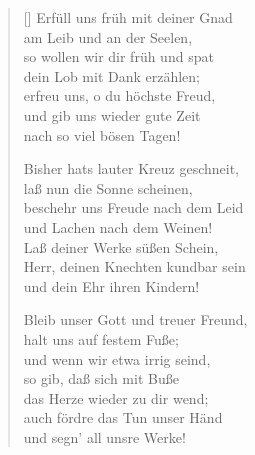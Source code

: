 \begin{multicols}{2}
\begin{verse}[\versewidth]
 Erfüll uns früh mit deiner Gnad\\
am Leib und an der Seelen,\\
so wollen wir dir früh und spat\\
dein Lob mit Dank erzählen;\\
erfreu uns, o du höchste Freud,\\
und gib uns wieder gute Zeit\\
nach so viel bösen Tagen!

 Bisher hats lauter Kreuz geschneit,\\
laß nun die Sonne scheinen,\\
beschehr uns Freude nach dem Leid\\
und Lachen nach dem Weinen!\\
Laß deiner Werke süßen Schein,\\
Herr, deinen Knechten kundbar sein\\
und dein Ehr ihren Kindern!

 Bleib unser Gott und treuer Freund,\\
halt uns auf festem Fuße;\\
und wenn wir etwa irrig seind,\\
so gib, daß sich mit Buße\\
das Herze wieder zu dir wend;\\
auch fördre das Tun unser Händ\\
und segn' all unsre Werke!

\end{verse}
\end{multicols}
